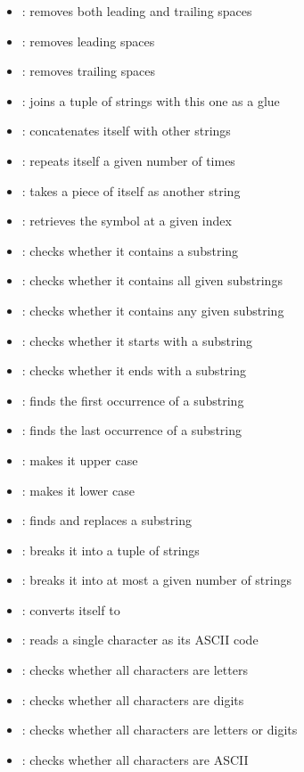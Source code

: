 \begin{itemize}
    \item {}: removes both leading and trailing spaces
    \item {}: removes leading spaces
    \item {}: removes trailing spaces
    \item {}: joins a tuple of strings with this one as a glue
    \item {}: concatenates itself with other strings
    \item {}: repeats itself a given number of times
    \item {}: takes a piece of itself as another string
    \item {}: retrieves the symbol at a given index
    \item {}: checks whether it contains a substring
    \item {}: checks whether it contains all given substrings
    \item {}: checks whether it contains any given substring
    \item {}: checks whether it starts with a substring
    \item {}: checks whether it ends with a substring
    \item {}: finds the first occurrence of a substring
    \item {}: finds the last occurrence of a substring
    \item {}: makes it upper case
    \item {}: makes it lower case
    \item {}: finds and replaces a substring
    \item {}: breaks it into a tuple of strings
    \item {}: breaks it into at most a given number of strings
    \item {}: converts itself to 
    \item {}: reads a single character as its ASCII code
    \item {}: checks whether all characters are letters
    \item {}: checks whether all characters are digits
    \item {}: checks whether all characters are letters or digits
    \item {}: checks whether all characters are ASCII
\end{itemize}

